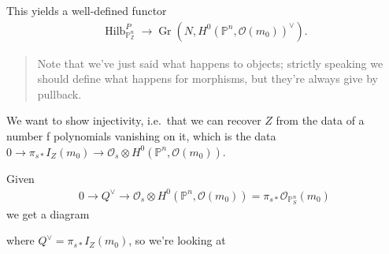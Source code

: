 This yields a well-defined functor
\begin{align*}
\operatorname{Hilb}_{{\mathbb{P}}^n_{\mathbb{Z}}}^P \to {\operatorname{Gr}}(N, H^0({\mathbb{P}}^n, {\mathcal{O}}(m_0))^\vee)
.\end{align*}

\begin{quote}
Note that we've just said what happens to objects; strictly speaking we
should define what happens for morphisms, but they're always give by
pullback.
\end{quote}

We want to show injectivity, i.e.~that we can recover \(Z\) from the
data of a number f polynomials vanishing on it, which is the data
\(0 \to \pi_{s*} I_Z(m_0) \to {\mathcal{O}}_s \otimes H^0({\mathbb{P}}^n, {\mathcal{O}}(m_0))\).

Given
\begin{align*}
0 \to Q^\vee\to {\mathcal{O}}_s \otimes H^0({\mathbb{P}}^n, {\mathcal{O}}(m_0)) = \pi_{s*} {\mathcal{O}}_{{\mathbb{P}}^n_S}(m_0)
\end{align*}
we get a diagram

\begin{center}
\end{center}

where \(Q^\vee= \pi_{s*} I_Z(m_0)\), so we're looking at

\begin{center}
\end{center}

